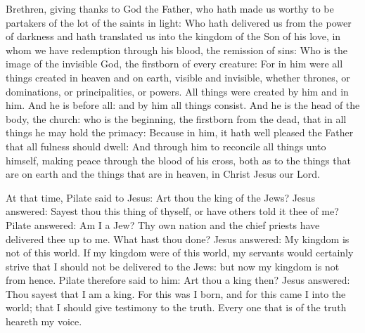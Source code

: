 



Brethren, giving thanks to God the Father, who hath made us worthy to be
partakers of the lot of the saints in light:
Who hath delivered us from the power of darkness and hath
translated us into the kingdom of the Son of his love,
in whom we have redemption through his blood, the remission of
sins:
Who is the image of the invisible God, the firstborn of every
creature:
For in him were all things created in heaven and on earth, visible
and invisible, whether thrones, or dominations, or principalities, or
powers. All things were created by him and in him.
And he is before all: and by him all things consist.
And he is the head of the body, the church: who is the beginning,
the firstborn from the dead, that in all things he may hold the primacy:
Because in him, it hath well pleased the Father that all fulness
should dwell:
And through him to reconcile all things unto himself, making peace
through the blood of his cross, both as to the things that are on earth
and the things that are in heaven, in Christ Jesus our Lord.

\bigskip


At that time, Pilate %
said to Jesus: Art thou the king of the Jews?
Jesus answered: Sayest thou this thing of thyself, or have others
told it thee of me?
Pilate answered: Am I a Jew? Thy own nation and the chief priests
have delivered thee up to me. What hast thou done?
Jesus answered: My kingdom is not of this world. If my kingdom
were of this world, my servants would certainly strive that I should not
be delivered to the Jews: but now my kingdom is not from hence.
Pilate therefore said to him: Art thou a king then? Jesus
answered: Thou sayest that I am a king. For this was I born, and for
this came I into the world; that I should give testimony to the truth.
Every one that is of the truth heareth my voice.


\bigskip

